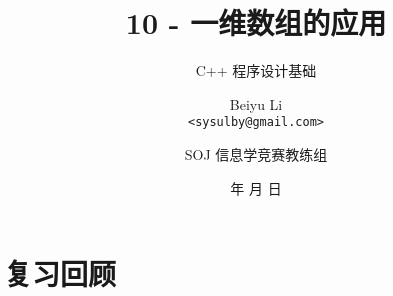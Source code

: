 \title[10 - 一维数组的应用]
{10 - 一维数组的应用}

\subtitle{C++ 程序设计基础}

\author[Beiyu Li]
{Beiyu Li\\
\texttt{<sysulby@gmail.com>}}


\date[\today]
{\number\year 年 \number\month 月 \number\day 日}




\author[sysulby]
{SOJ 信息学竞赛教练组}

\begin{frame}
    \titlepage
\end{frame}
\setcounter{framenumber}{0} %


\section{复习回顾}

